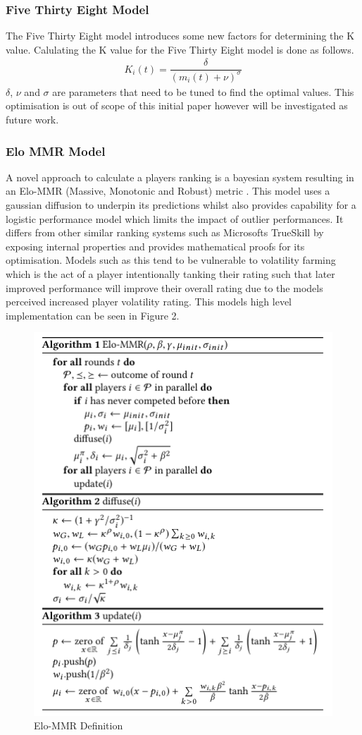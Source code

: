 \documentclass[12pt,a4paper]{article}
\begin{document}
\subsubsection{Five Thirty Eight Model}
The Five Thirty Eight model introduces some new factors for determining the K
value. Calulating the K value for the Five Thirty Eight model is done as follows.
\begin{gather}
  K_i(t) = \dfrac{\delta}{{(m_i(t) + \nu)}^{\sigma}}
\end{gather}
$\delta$, $\nu$ and $\sigma$ are parameters that need to be tuned to find the
optimal values. This optimisation is out of scope of this initial paper however will be
investigated as future work.
\subsubsection{Elo MMR Model}
A novel approach to calculate a players ranking is a bayesian system resulting in an Elo-MMR
(Massive, Monotonic and Robust) metric \cite{EloMMR2021}. This model uses a gaussian diffusion
to underpin its predictions whilst also provides capability for a logistic performance
model which limits the impact of outlier performances. It differs from other similar
ranking systems such as Microsofts TrueSkill \cite{herbrich_trueskill_2006} by exposing
internal properties and provides mathematical proofs for its optimisation.
Models such as this tend to be vulnerable to volatility farming which is the act of a
player intentionally tanking their rating such that later improved performance will
improve their overall rating due to the models perceived increased player volatility
rating. This models high level implementation can be seen in Figure 2.
\begin{figure}[H]
  \centering
  \includegraphics{images/elommr.PNG}
  \caption{Elo-MMR Definition}
  \label{fig:elommr}
\end{figure}
\end{document}
